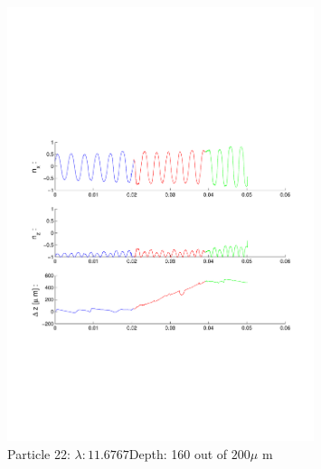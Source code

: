 \begin{figure}[H]


\centering
\includegraphics[width=0.8\textwidth]{Images/Particle 22/Particle22.pdf}
\caption{Particle 22: $ \lambda: 11.6767$Depth: 160 out of $200 \mu $ m}

\end{figure}

